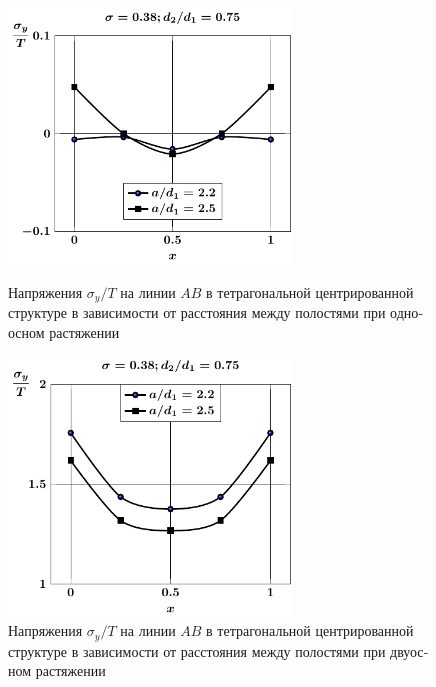 \begin{russian}
\begin{figure}[h!]
\centering\footnotesize
\parbox[b]{7.5cm}{\centering\includegraphics[width=7.5cm]{cav9-a-d75-t1-sig_y.pdf}
\caption{Напряжения $\sigma_y/T$ на линии $AB$ в тетрагональной центрированной структуре в зависимости от расстояния между полостями при одноосном растяжении 
\label{f:9:38}}}\hfil\hfil
\parbox[b]{7.5cm}{\centering\includegraphics[width=7.5cm]{cav9-a-d75-t2-sig_y.pdf}
\caption{Напряжения $\sigma_y/T$ на линии $AB$ в тетрагональной центрированной структуре в зависимости от расстояния между полостями при двуосном растяжении
\label{f:9:39}}}
\end{figure}


\end{russian}
